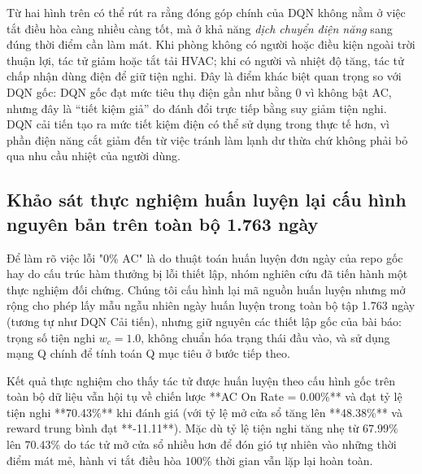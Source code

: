 \documentclass[12pt, a4paper]{article}
\begin{document}
Từ hai hình trên có thể rút ra rằng đóng góp chính của DQN không nằm ở việc tắt điều hòa càng nhiều càng tốt, mà ở khả năng \textit{dịch chuyển điện năng} sang đúng thời điểm cần làm mát. Khi phòng không có người hoặc điều kiện ngoài trời thuận lợi, tác tử giảm hoặc tắt tải HVAC; khi có người và nhiệt độ tăng, tác tử chấp nhận dùng điện để giữ tiện nghi. Đây là điểm khác biệt quan trọng so với DQN gốc: DQN gốc đạt mức tiêu thụ điện gần như bằng 0 vì không bật AC, nhưng đây là ``tiết kiệm giả'' do đánh đổi trực tiếp bằng suy giảm tiện nghi. DQN cải tiến tạo ra mức tiết kiệm điện có thể sử dụng trong thực tế hơn, vì phần điện năng cắt giảm đến từ việc tránh làm lạnh dư thừa chứ không phải bỏ qua nhu cầu nhiệt của người dùng.

\subsection{Khảo sát thực nghiệm huấn luyện lại cấu hình nguyên bản trên toàn bộ 1.763 ngày}
Để làm rõ việc lỗi "0\% AC" là do thuật toán huấn luyện đơn ngày của repo gốc hay do cấu trúc hàm thưởng bị lỗi thiết lập, nhóm nghiên cứu đã tiến hành một thực nghiệm đối chứng. Chúng tôi cấu hình lại mã nguồn huấn luyện nhưng mở rộng cho phép lấy mẫu ngẫu nhiên ngày huấn luyện trong toàn bộ tập 1.763 ngày (tương tự như DQN Cải tiến), nhưng giữ nguyên các thiết lập gốc của bài báo: trọng số tiện nghi $w_c = 1.0$, không chuẩn hóa trạng thái đầu vào, và sử dụng mạng Q chính để tính toán Q mục tiêu ở bước tiếp theo.

Kết quả thực nghiệm cho thấy tác tử được huấn luyện theo cấu hình gốc trên toàn bộ dữ liệu vẫn hội tụ về chiến lược **AC On Rate = 0.00\%** và đạt tỷ lệ tiện nghi **70.43\%** khi đánh giá (với tỷ lệ mở cửa sổ tăng lên **48.38\%** và reward trung bình đạt **-11.11**). Mặc dù tỷ lệ tiện nghi tăng nhẹ từ $67.99\%$ lên $70.43\%$ do tác tử mở cửa sổ nhiều hơn để đón gió tự nhiên vào những thời điểm mát mẻ, hành vi tắt điều hòa $100\%$ thời gian vẫn lặp lại hoàn toàn.
\end{document}
